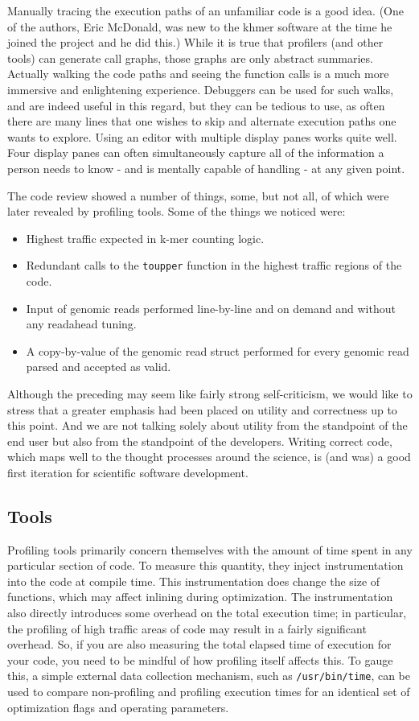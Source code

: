 Manually tracing the execution paths of an unfamiliar code is a good idea.
(One of the authors, Eric McDonald, was new to the khmer software at the time
he joined the project and he did this.) While it is true that profilers (and
other tools) can generate call graphs, those graphs are only abstract
summaries. Actually walking the code paths and seeing the function calls is a
much more immersive and enlightening experience. Debuggers can be used for such
walks, and are indeed useful in this regard, but they can be tedious to use, as
often there are many lines that one wishes to skip and alternate execution
paths one wants to explore. Using an editor with multiple display panes works
quite well. Four display panes can often simultaneously capture all of the
information a person needs to know - and is mentally capable of handling - at
any given point.

The code review showed a number of things, some, but not all, of which were
later revealed by profiling tools. Some of the things we noticed were:

\begin{itemize}
\item Highest traffic expected in k-mer counting logic.
\item Redundant calls to the \texttt{toupper} function in the highest traffic 
regions of the code.
\item Input of genomic reads performed line-by-line and on demand and without 
any readahead tuning.
\item A copy-by-value of the genomic read struct performed for every genomic 
read parsed and accepted as valid.
\end{itemize}

Although the preceding may seem like fairly strong self-criticism, we would
like to stress that a greater emphasis had been placed on utility and
correctness up to this point. And we are not talking solely about utility from
the standpoint of the end user but also from the standpoint of the developers.
Writing correct code, which maps well to the thought processes around the
science, is (and was) a good first iteration for scientific software
development. 

\subsection{Tools}

Profiling tools primarily concern themselves with the amount of time spent in
any particular section of code. To measure this quantity, they inject
instrumentation into the code at compile time. This instrumentation does change
the size of functions, which may affect inlining during optimization.  The
instrumentation also directly introduces some overhead on the total execution
time; in particular, the profiling of high traffic areas of code may result in
a fairly significant overhead. So, if you are also measuring the total elapsed
time of execution for your code, you need to be mindful of how profiling itself
affects this. To gauge this, a simple external data collection mechanism, such
as \texttt{/usr/bin/time}, can be used to compare non-profiling and profiling
execution times for an identical set of optimization flags and operating
parameters.

